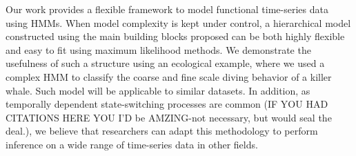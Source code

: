 


Our work provides a flexible framework to model functional time-series data using HMMs. When model complexity is kept under control, a hierarchical model constructed using the main building blocks proposed can be both highly flexible and easy to fit using maximum likelihood methods. We demonstrate the usefulness of such a structure using an ecological example, where we used a complex HMM to classify the coarse and fine scale diving behavior of a killer whale. Such model will be applicable to similar datasets. In addition, as temporally dependent state-switching processes are common (IF YOU HAD CITATIONS HERE YOU I'D be AMZING-not necessary, but would seal the deal.), we believe that researchers can adapt this methodology to perform inference on a wide range of time-series data in other fields.